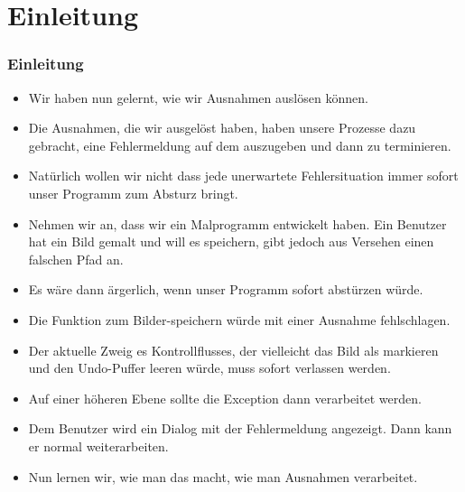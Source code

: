 \documentclass[aspectratio=169,mathserif,notheorems]{beamer}%
\subtitle{32.~Ausnahmen verarbeiten}%
\begin{document}
%
%
\startPresentation%
%
\section{Einleitung}%
\begin{frame}%
\frametitle{Einleitung}%
\begin{itemize}%
\item Wir haben nun gelernt, wie wir Ausnahmen auslösen können.%
%
\item<2-> Die Ausnahmen, die wir ausgelöst haben, haben unsere Prozesse dazu gebracht, eine Fehlermeldung auf dem  auszugeben und dann zu terminieren.%
%
\item<3-> Natürlich wollen wir nicht dass jede unerwartete Fehlersituation immer sofort unser Programm zum Absturz bringt.%
%
\item<4-> Nehmen wir an, dass wir ein Malprogramm entwickelt haben. Ein Benutzer hat ein Bild gemalt und will es speichern, gibt jedoch aus Versehen einen falschen Pfad an.%
%
\item<5-> Es wäre dann ärgerlich, wenn unser Programm sofort abstürzen würde.%
%
\item<6-> Die Funktion zum Bilder-speichern würde mit einer Ausnahme fehlschlagen.%
%
\item<7-> Der aktuelle Zweig es Kontrollflusses, der vielleicht das Bild als  markieren und den Undo-Puffer leeren würde, muss sofort verlassen werden.%
%
\item<8-> Auf einer höheren Ebene sollte die Exception dann verarbeitet werden.%
%
\item<9-> Dem Benutzer wird ein Dialog mit der Fehlermeldung angezeigt. Dann kann er normal weiterarbeiten.%
%
\item<10-> Nun lernen wir, wie man das macht, \alert{wie man Ausnahmen verarbeitet}.%
\end{itemize}%
\end{frame}%
%
\end{document}
